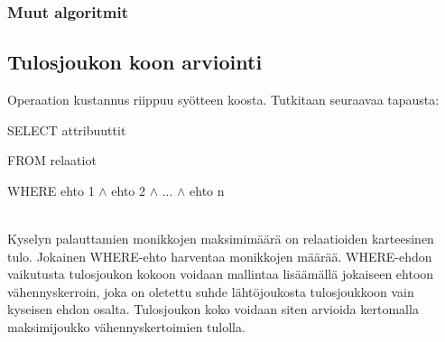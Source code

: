 \documentclass[finnish]{tktltiki2}
\theoremstyle{definition}
\theoremstyle{remark}
\begin{document}
\subsubsection{Muut algoritmit}

\subsection{Tulosjoukon koon arviointi}
Operaation kustannus riippuu syötteen koosta. Tutkitaan seuraavaa tapausta:
\newline

\begin{frame}

SELECT attribuuttit

FROM relaatiot

WHERE ehto 1 $\wedge$ ehto 2 $\wedge$ ... $\wedge$ ehto n
\end{frame}
\\\newline
Kyselyn palauttamien monikkojen maksimimäärä on relaatioiden karteesinen tulo. Jokainen WHERE-ehto harventaa monikkojen määrää. WHERE-ehdon vaikutusta tulosjoukon kokoon voidaan mallintaa lisäämällä jokaiseen ehtoon vähennyskerroin, joka on oletettu suhde lähtöjoukosta tulosjoukkoon vain kyseisen ehdon osalta. 
Tulosjoukon koko voidaan siten arvioida kertomalla maksimijoukko vähennyskertoimien tulolla. \cite{ramakrishnan2003database}
\end{document}
